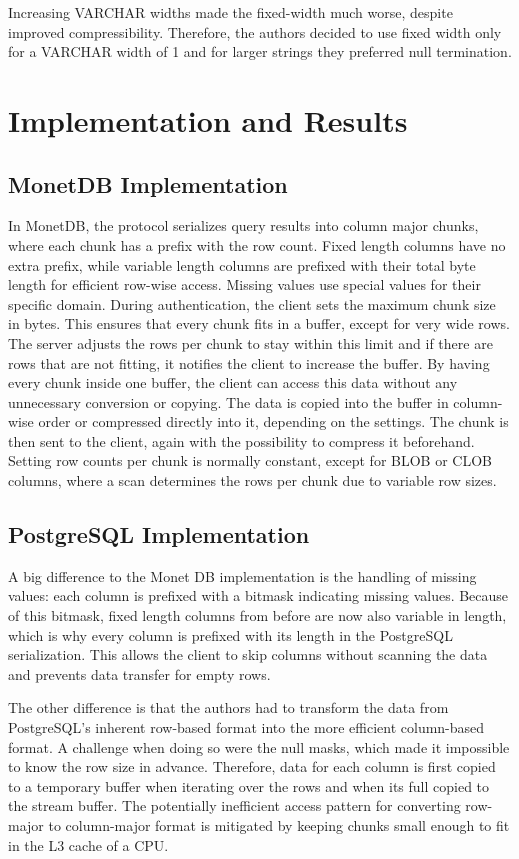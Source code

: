 \documentclass[sigconf]{acmart}
\begin{document}
Increasing VARCHAR widths made the fixed-width much worse, despite improved compressibility. Therefore, the authors decided to use fixed width only for a VARCHAR width of 1 and for larger strings they preferred null termination.


\section{Implementation and Results}

\subsection{MonetDB Implementation}
In MonetDB, the protocol serializes query results into column major chunks, where each chunk has a prefix with the row count. Fixed length columns have no extra prefix, while variable length columns are prefixed with their total byte length for efficient row-wise access. Missing values use special values for their specific domain.
During authentication, the client sets the maximum chunk size in bytes. This ensures that every chunk fits in a buffer, except for very wide rows. The server adjusts the rows per chunk to stay within this limit and if there are rows that are not fitting, it notifies the client to increase the buffer. By having every chunk inside one buffer, the client can access this data without any unnecessary conversion or copying.
The data is copied into the buffer in column-wise order or compressed directly into it, depending on the settings. The chunk is then sent to the client, again with the possibility to compress it beforehand. Setting row counts per chunk is normally constant, except for BLOB or CLOB columns, where a scan determines the rows per chunk due to variable row sizes.

\subsection{PostgreSQL Implementation}
A big difference to the Monet DB implementation is the handling of missing values: each column is prefixed with a bitmask indicating missing values. Because of this bitmask, fixed length columns from before are now also variable in length, which is why every column is prefixed with its length in the PostgreSQL serialization. This allows the client to skip columns without scanning the data and prevents data transfer for empty rows.

The other difference is that the authors had to transform the data from PostgreSQL’s inherent row-based format into the more efficient column-based format. A challenge when doing so were the null masks, which made it impossible to know the row size in advance. Therefore, data for each column is first copied to a temporary buffer when iterating over the rows and when its full copied to the stream buffer. The potentially inefficient access pattern for converting row-major to column-major format is mitigated by keeping chunks small enough to fit in the L3 cache of a CPU.
\end{document}
